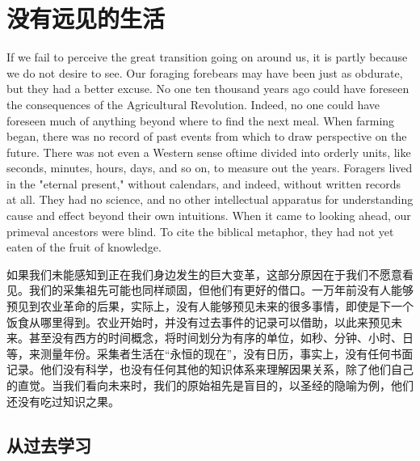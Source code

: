 \section{没有远见的生活}


\begin{Parallel}{97mm}{45mm}


  

  \ParallelLText
  {If we fail to perceive the great transition going on around us, it is partly because we do not desire to see. Our foraging forebears may have been just as obdurate, but they had a better excuse. No one ten thousand years ago could have foreseen the consequences of the Agricultural Revolution. Indeed, no one could have foreseen much of anything beyond where to find the next meal. When farming began, there was no record of past events from which to draw perspective on the future. There was not even a Western sense oftime divided into orderly units, like seconds, minutes, hours, days, and so on, to measure out the years. Foragers lived in the "eternal present," without calendars, and indeed, without written records at all. They had no science, and no other intellectual apparatus for understanding cause and effect beyond their own intuitions. When it came to looking ahead, our primeval ancestors were blind. To cite the biblical metaphor, they had not yet eaten of the fruit of knowledge.}
  
  \ParallelRText
  {如果我们未能感知到正在我们身边发生的巨大变革，这部分原因在于我们不愿意看见。我们的采集祖先可能也同样顽固，但他们有更好的借口。一万年前没有人能够预见到农业革命的后果，实际上，没有人能够预见未来的很多事情，即使是下一个饭食从哪里得到。农业开始时，并没有过去事件的记录可以借助，以此来预见未来。甚至没有西方的时间概念，将时间划分为有序的单位，如秒、分钟、小时、日等，来测量年份。采集者生活在“永恒的现在”，没有日历，事实上，没有任何书面记录。他们没有科学，也没有任何其他的知识体系来理解因果关系，除了他们自己的直觉。当我们看向未来时，我们的原始祖先是盲目的，以圣经的隐喻为例，他们还没有吃过知识之果。}
  \ParallelPar

  \subsection{从过去学习}


\end{Parallel}
